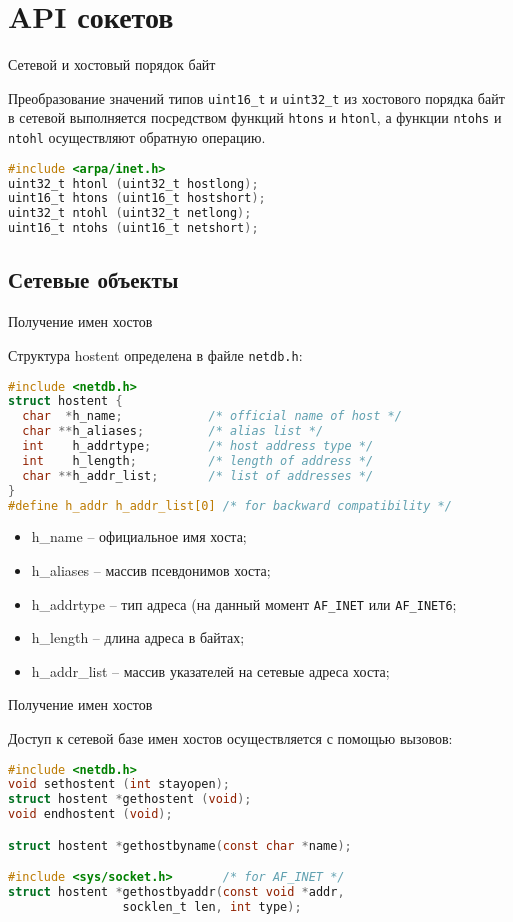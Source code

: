 \section{API сокетов}
\begin{frame}[fragile]{Сетевой и хостовый порядок байт}

Преобразование значений типов {\tt uint16\_t} и {\tt uint32\_t} из хостового порядка 
байт в сетевой выполняется посредством функций {\tt htons} и {\tt htonl},
а функции {\tt ntohs} и {\tt ntohl} осуществляют обратную операцию.

\begin{lstlisting}[language=C]
#include <arpa/inet.h>
uint32_t htonl (uint32_t hostlong);
uint16_t htons (uint16_t hostshort);
uint32_t ntohl (uint32_t netlong);
uint16_t ntohs (uint16_t netshort);
\end{lstlisting}
\end{frame}

\subsection{Сетевые объекты}
\begin{frame}[fragile]{Получение имен хостов}

Структура hostent определена в файле {\tt netdb.h}:
\scriptsize
\begin{lstlisting}[language=C]
#include <netdb.h>
struct hostent {
  char  *h_name;            /* official name of host */
  char **h_aliases;         /* alias list */
  int    h_addrtype;        /* host address type */
  int    h_length;          /* length of address */
  char **h_addr_list;       /* list of addresses */
}
#define h_addr h_addr_list[0] /* for backward compatibility */
\end{lstlisting}
\normalsize
\begin{itemize}
\item h\_name -- официальное имя хоста;
\item h\_aliases -- массив псевдонимов хоста;
\item h\_addrtype -- тип адреса (на данный момент {\tt AF\_INET} или {\tt AF\_INET6};
\item h\_length -- длина адреса в байтах;
\item h\_addr\_list -- массив указателей на сетевые адреса хоста;
\end{itemize}
\end{frame}

\begin{frame}[fragile]{Получение имен хостов}

Доступ к сетевой базе имен хостов осуществляется с помощью вызовов:
\begin{lstlisting}[language=C]
#include <netdb.h>
void sethostent (int stayopen);
struct hostent *gethostent (void);
void endhostent (void);

struct hostent *gethostbyname(const char *name);

#include <sys/socket.h>       /* for AF_INET */
struct hostent *gethostbyaddr(const void *addr,
				socklen_t len, int type);
\end{lstlisting}
\end{frame}

